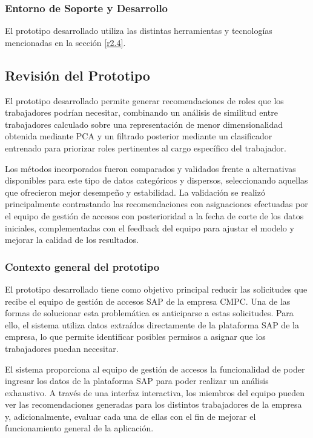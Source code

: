 \documentclass[11pt,letterpaper]{article}
\begin{document}
\hypertarget{entorno-de-soporte-y-desarrollo}{%
\subsubsection{Entorno de Soporte y
Desarrollo}\label{entorno-de-soporte-y-desarrollo}}

El prototipo desarrollado utiliza las distintas herramientas y
tecnologías mencionadas en la sección \autoref{r2.4}.

\hypertarget{revisiuxf3n-del-prototipo}{%
\subsection{Revisión del Prototipo}\label{revisiuxf3n-del-prototipo}}

El prototipo desarrollado permite generar recomendaciones de roles que los trabajadores podrían necesitar, combinando un análisis de similitud entre trabajadores calculado sobre una representación de menor dimensionalidad obtenida mediante PCA y un filtrado posterior mediante un clasificador entrenado para priorizar roles pertinentes al cargo específico del trabajador.

Los métodos incorporados fueron comparados y validados frente a alternativas disponibles para este tipo de datos categóricos y dispersos, seleccionando aquellas que ofrecieron mejor desempeño y estabilidad. La validación se realizó principalmente contrastando las recomendaciones con asignaciones efectuadas por el equipo de gestión de accesos con posterioridad a la fecha de corte de los datos iniciales, complementadas con el feedback del equipo para ajustar el modelo y mejorar la calidad de los resultados.

\hypertarget{contexto-general-del-prototipo}{%
\subsubsection{Contexto general del
prototipo}\label{contexto-general-del-prototipo}}

El prototipo desarrollado tiene como objetivo principal reducir las
solicitudes que recibe el equipo de gestión de accesos SAP de la empresa
CMPC. Una de las formas de solucionar esta problemática es anticiparse a
estas solicitudes. Para ello, el sistema utiliza datos extraídos
directamente de la plataforma SAP de la empresa, lo que permite
identificar posibles permisos a asignar que los trabajadores puedan
necesitar.

El sistema proporciona al equipo de gestión de accesos la funcionalidad
de poder ingresar los datos de la plataforma SAP para poder realizar un
análisis exhaustivo. A través de una interfaz interactiva, los miembros
del equipo pueden ver las recomendaciones generadas para los distintos
trabajadores de la empresa y, adicionalmente, evaluar cada una de ellas
con el fin de mejorar el funcionamiento general de la aplicación.
\end{document}
